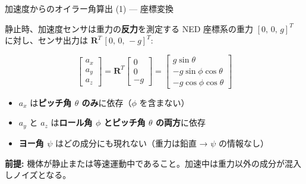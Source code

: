\begin{frame}{加速度からのオイラー角算出 (1) --- 座標変換}

  \begin{block}{静止時、加速度センサは重力の\textbf{反力}を測定する}
    {\small
    NED 座標系の重力 $[0,\,0,\,g]^T$ に対し、センサ出力は $\mathbf{R}^T\,[0,\,0,\,-g]^T$:
    }
  \end{block}

  {\small
  \[
  \begin{bmatrix} a_x \\ a_y \\ a_z \end{bmatrix}
  = \mathbf{R}^T
  \begin{bmatrix} 0 \\ 0 \\ -g \end{bmatrix}
  = \begin{bmatrix}
    g\sin\theta \\
    -g\sin\phi\cos\theta \\
    -g\cos\phi\cos\theta
  \end{bmatrix}
  \]
  }

  \vspace{-0.3em}

  {\small
  \begin{itemize}
    \item $a_x$ は\textbf{ピッチ角 $\theta$ のみ}に依存（$\phi$ を含まない）
    \item $a_y$ と $a_z$ は\textbf{ロール角 $\phi$ とピッチ角 $\theta$ の両方}に依存
    \item \textbf{ヨー角 $\psi$} はどの成分にも現れない（重力は鉛直 → $\psi$ の情報なし）
  \end{itemize}
  }

  \vspace{0.3em}

  {\footnotesize
  \textbf{前提:} 機体が静止または等速運動中であること。加速中は重力以外の成分が混入しノイズとなる。
  }
\end{frame}

